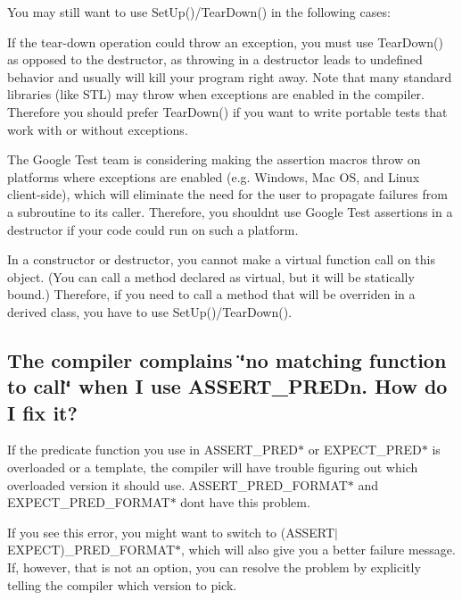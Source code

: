 You may still want to use {\ttfamily Set\+Up()/\+Tear\+Down()} in the following cases\+:
\begin{DoxyItemize}
\item If the tear-\/down operation could throw an exception, you must use {\ttfamily Tear\+Down()} as opposed to the destructor, as throwing in a destructor leads to undefined behavior and usually will kill your program right away. Note that many standard libraries (like S\+TL) may throw when exceptions are enabled in the compiler. Therefore you should prefer {\ttfamily Tear\+Down()} if you want to write portable tests that work with or without exceptions.
\item The Google Test team is considering making the assertion macros throw on platforms where exceptions are enabled (e.\+g. Windows, Mac OS, and Linux client-\/side), which will eliminate the need for the user to propagate failures from a subroutine to its caller. Therefore, you shouldn\textquotesingle{}t use Google Test assertions in a destructor if your code could run on such a platform.
\item In a constructor or destructor, you cannot make a virtual function call on this object. (You can call a method declared as virtual, but it will be statically bound.) Therefore, if you need to call a method that will be overriden in a derived class, you have to use {\ttfamily Set\+Up()/\+Tear\+Down()}.
\end{DoxyItemize}

\subsection*{The compiler complains \char`\"{}no matching function to call\char`\"{} when I use A\+S\+S\+E\+R\+T\+\_\+\+P\+R\+E\+Dn. How do I fix it?}

If the predicate function you use in {\ttfamily A\+S\+S\+E\+R\+T\+\_\+\+P\+R\+E\+D$\ast$} or {\ttfamily E\+X\+P\+E\+C\+T\+\_\+\+P\+R\+E\+D$\ast$} is overloaded or a template, the compiler will have trouble figuring out which overloaded version it should use. {\ttfamily A\+S\+S\+E\+R\+T\+\_\+\+P\+R\+E\+D\+\_\+\+F\+O\+R\+M\+A\+T$\ast$} and {\ttfamily E\+X\+P\+E\+C\+T\+\_\+\+P\+R\+E\+D\+\_\+\+F\+O\+R\+M\+A\+T$\ast$} don\textquotesingle{}t have this problem.

If you see this error, you might want to switch to {\ttfamily (A\+S\+S\+E\+R\+T$\vert$\+E\+X\+P\+E\+CT)\+\_\+\+P\+R\+E\+D\+\_\+\+F\+O\+R\+M\+A\+T$\ast$}, which will also give you a better failure message. If, however, that is not an option, you can resolve the problem by explicitly telling the compiler which version to pick.

